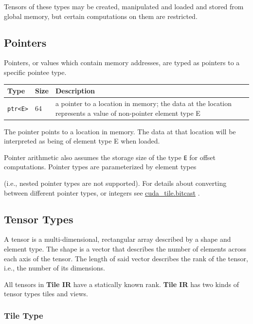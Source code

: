 \documentclass{article}
\begin{document}
Tensors of these types may be created, manipulated and loaded and stored from global memory, but certain computations on them are restricted.



\subsection{Pointers}

Pointers, or values which contain memory addresses, are typed as pointers to a specific pointee type.


\begin{longtable}{l|l|l}
\hline
Type & Size & Description \\ \hline
\texttt{ptr<E>} & 64 & a pointer to a location in memory; the data at the location represents a value of non-pointer element type E \\ \hline
\end{longtable}

The pointer points to a location in memory. The data at that location will be interpreted as being of element type E when loaded.


Pointer arithmetic also assumes the storage size of the type \texttt{E} for offset computations. Pointer types are parameterized by element types

(i.e., nested pointer types are not supported). For details about converting between different pointer types, or integers see \href{https://docs.nvidia.com/cuda/tile-ir/latest/sections/operations.html#op-cuda-tile-bitcast}{cuda\_tile.bitcast} .



\subsection{Tensor Types}

A tensor is a multi-dimensional, rectangular array described by a shape and element type. The shape is a vector that describes the number of elements across each axis of the tensor. The length of said vector describes the rank of the tensor, i.e., the number of its dimensions.

All tensors in \textbf{Tile IR} have a statically known rank. \textbf{Tile IR} has two kinds of tensor types tiles and views.


\subsubsection{Tile Type}
\end{document}

